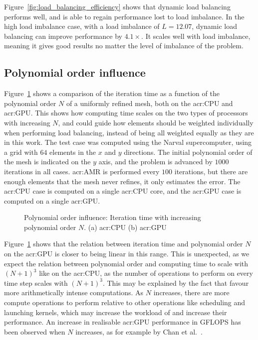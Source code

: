 Figure~\ref{fig:load_balancing_efficiency} shows that dynamic load balancing performs well, and is
able to regain performance lost to load imbalance. In the high load imbalance case, with a load
imbalance of \(L = 12.07\), dynamic load balancing can improve performance by \(4.1 \times \). It
scales well with load imbalance, meaning it gives good results no matter the level of imbalance of
the problem.

\subsection{Polynomial order influence}\label{subsection:results:load_balancing_performance:polynomial_order}

Figure~\ref{fig:N_influence} shows a comparison of the iteration time as a function of the
polynomial order \(N\) of a uniformly refined mesh, both on the \acrshort{acr:CPU} and
\acrshort{acr:GPU}. This shows how computing time scales on the two types of processors with
increasing \(N\), and could guide how elements should be weighted individually when performing load
balancing, instead of being all weighted equally as they are in this work. The test case was
computed using the Narval supercomputer, using a grid with \(64\) elements in the \(x\) and \(y\)
directions. The initial polynomial order of the mesh is indicated on the \(y\) axis, and the problem
is advanced by \(1000\) iterations in all cases. \Acrshort{acr:AMR} is performed every \(100\)
iterations, but there are enough elements that the mesh never refines, it only estimates the error.
The \acrshort{acr:CPU} case is computed on a single \acrshort{acr:CPU} core, and the
\acrshort{acr:GPU} case is computed on a single \acrshort{acr:GPU}.

\begin{figure}[H]
	\centering
	\hfill
	\caption{Polynomial order influence: Iteration time with increasing polynomial order \(N\). (a) \Acrshort{acr:CPU} (b) \Acrshort{acr:GPU}}\label{fig:N_influence}
\end{figure}

Figure~\ref{fig:N_influence} shows that the relation between iteration time and polynomial order
\(N\) on the \acrshort{acr:GPU} is closer to being linear in this range. This is unexpected, as we
expect the relation between polynomial order and computing time to scale with \({\left( N + 1
\right)}^3\) like on the \acrshort{acr:CPU}, as the number of operations to perform on every time
step scales with \({\left( N + 1 \right)}^3\). This may be explained by the fact that
 favour more arithmetically intense computations. As \(N\) increases, there are
more compute operations to perform relative to other operations like scheduling and launching
kernels, which may increase the workload of  and increase their performance. An
increase in realisable \acrshort{acr:GPU} performance in GFLOPS has been observed when \(N\)
increases, as for example by Chan et al.~\cite{Chan2016}.

